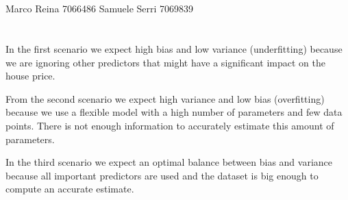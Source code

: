 \documentclass[12pt]{article}
\begin{document}
\section*{}
Marco Reina 7066486 \newline
Samuele Serri 7069839 \newline
\section*{}

In the first scenario we expect high bias and low variance (underfitting)
because we are ignoring other predictors that might have a significant impact on the house price.

From the second scenario we expect high variance and low bias (overfitting)
because we use a flexible model with a high number of parameters and few data points.
There is not enough information to accurately estimate this amount of parameters.

In the third scenario we expect an optimal balance between bias and variance
because all important predictors are used and the dataset is big enough to compute an accurate estimate.
\end{document}
